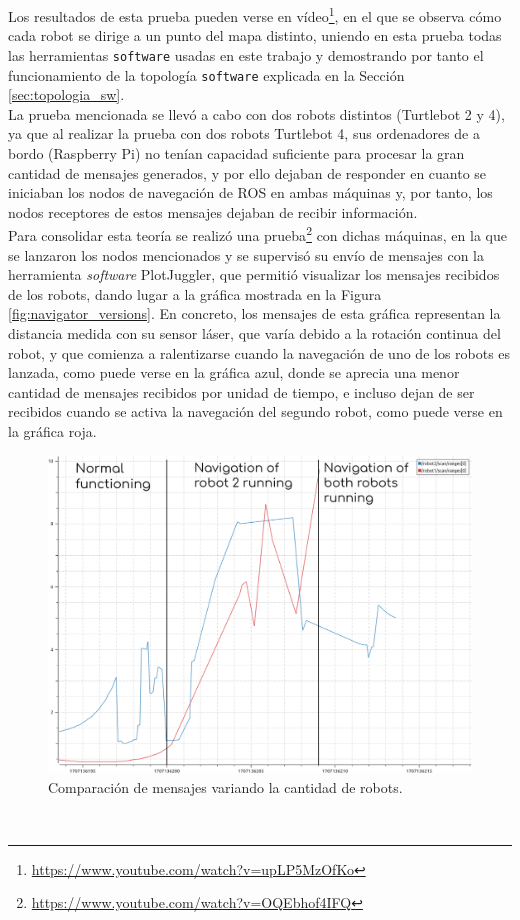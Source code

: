 Los resultados de esta prueba pueden verse en vídeo\footnote{
\href{https://www.youtube.com/watch?v=upLP5MzOfKo}{https://www.youtube.com/watch?v=upLP5MzOfKo}},
en el que se observa cómo cada robot se dirige a un punto del mapa distinto,
uniendo en esta prueba todas las herramientas \texttt{software} usadas en este
trabajo y demostrando por tanto el funcionamiento de la topología
\texttt{software} explicada en la Sección \ref{sec:topologia_sw}.
\\

La prueba mencionada se llevó a cabo con dos robots distintos (Turtlebot 2 y 4),
ya que al realizar la prueba con dos robots Turtlebot 4, sus ordenadores de a
bordo (Raspberry Pi) no tenían capacidad suficiente para procesar la gran
cantidad de mensajes generados, y por ello dejaban de responder en cuanto se
iniciaban los nodos de navegación de ROS en ambas máquinas y, por tanto, los
nodos receptores de estos mensajes dejaban de recibir información.
\\

Para consolidar esta teoría se realizó una prueba\footnote{
\href{https://www.youtube.com/watch?v=OQEbhof4IFQ}{https://www.youtube.com/watch?v=OQEbhof4IFQ}}
con dichas máquinas, en la que se lanzaron los nodos mencionados y se supervisó
su envío de mensajes con la herramienta \textit{software} PlotJuggler, que
permitió visualizar los mensajes recibidos de los robots, dando lugar a la
gráfica mostrada en la Figura \ref{fig:navigator_versions}.
En concreto, los mensajes de esta gráfica representan la distancia medida con su
sensor láser, que varía debido a la rotación continua del robot, y que comienza
a ralentizarse cuando la navegación de uno de los robots es lanzada, como puede
verse en la gráfica azul, donde se aprecia una menor cantidad de mensajes
recibidos por unidad de tiempo, e incluso dejan de ser recibidos cuando se
activa la navegación del segundo robot, como puede verse en la gráfica roja.
\\

\begin{figure} [h!]
  \begin{center}
    \includegraphics[width=12cm]{figs/plot_congestion_explained}
  \end{center}
  \caption{Comparación de mensajes variando la cantidad de robots.}
  \label{fig:plot_congestion}
\end{figure}\


